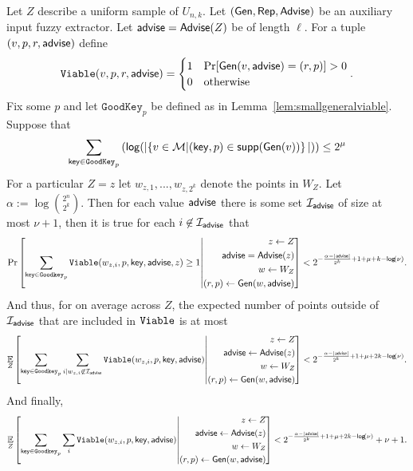 \begin{corollary}
\label{corollary:info loss}
Let $Z$ describe a uniform sample of $U_{n,k}$.  Let $({\mathsf{Gen}}, {\mathsf{Rep}}, {\mathsf{Advise}})$ be an auxiliary input fuzzy extractor.  Let ${\mathsf{advise}} = {\mathsf{Advise}}(Z)$ be of length $\ell$.  For a tuple $(v, p, r, {\mathsf{advise}})$ define 
\[
\mathtt{Viable}(v, p, r, {\mathsf{advise}}) = \begin{cases} 1& \Pr[{\mathsf{Gen}}(v, {\mathsf{advise}}) = (r, p)]>0\\0&\text{otherwise}\end{cases}.\]
Fix some $p$ and let $\mathtt{GoodKey}_p$ be defined as in Lemma~\ref{lem:smallgeneralviable}. Suppose that 
\[
   \sum_{\mathsf{key}\in \mathtt{GoodKey}_p} \left( \mathsf{log}\!\left(|\!\left\{ v \in \mathcal{M}|\!\left(\mathsf{key}, p\right) \in \mathsf{supp}\!\left(\mathsf{Gen}(v)\right) \right\}|\right)\right) \le 2^\mu 
 \]
 For a particular $Z=z$ let $w_{z,1},..., w_{z,2^k}$ denote the points in $W_Z$. Let $\alpha:= \log {2^n\choose 2^k}$.  
 Then for each value ${\mathsf{advise}}$ there is some set $\mathcal{I}_{{\mathsf{advise}}}$ of size at most $\nu+1$, then it is true for each $i\not \in \mathcal{I}_{\mathsf{advise}}$ that
\[
\Pr\left[\sum_{\mathsf{key} \in \mathtt{Goodkey}_p} \mathtt{Viable}(w_{z,i}, p, \mathsf{key}, {\mathsf{advise}}, z) \ge 1\middle| \begin{aligned} z\leftarrow Z\\ {\mathsf{advise}}= {\mathsf{Advise}}(z)\\w\leftarrow W_Z\\(r, p)\leftarrow {\ensuremath{\mathsf{Gen}}}(w, {\mathsf{advise}}) \end{aligned} \right]< 2^{-\frac{\alpha-|{\mathsf{advise}}|}{2^k}+1+\mu+k-\mathsf{log}\!\left(\nu\right) }.
\]
And thus, for on average across $Z$, the expected number of points outside of $\mathcal{I}_{\mathsf{advise}}$ that are included in $\mathtt{Viable}$ is at most 
\begin{align*}
\operatorname*{\mathbb{E}}_{Z} \left[\sum_{\mathsf{key} \in \mathtt{Goodkey}_p}\sum_{i | w_{z,i}\not\in\mathcal{I}_{\mathsf{advise}}} \mathtt{Viable}(w_{z,i}, p, \mathsf{key}, {\mathsf{advise}}) \middle| \begin{aligned} z\leftarrow Z\\ {\mathsf{advise}}\leftarrow {\ensuremath{\mathsf{Advise}}}(z)\\w\leftarrow W_Z\\(r, p)\leftarrow {\ensuremath{\mathsf{Gen}}}(w, {\mathsf{advise}})\end{aligned} \right]< 2^{-\frac{\alpha - |{\mathsf{advise}}|}{2^k}+1+\mu+2k-\mathsf{log}\!\left(\nu\right)}.
\end{align*}
And finally, 
\begin{align*}
\operatorname*{\mathbb{E}}_{Z} \left[\sum_{\mathsf{key} \in \mathtt{Goodkey}_p}\sum_{i }  \mathtt{Viable}(w_{z,i}, p, \mathsf{key}, {\mathsf{advise}}) \middle| \begin{aligned} z\leftarrow Z\\ {\mathsf{advise}}\leftarrow {\ensuremath{\mathsf{Advise}}}(z)\\w\leftarrow W_Z\\(r, p)\leftarrow {\ensuremath{\mathsf{Gen}}}(w, {\mathsf{advise}})\end{aligned} \right]< 2^{-\frac{\alpha-|{\mathsf{advise}}|}{2^k}+1+\mu+2k-\mathsf{log}\!\left(\nu\right)}+\nu+1.
\end{align*}

\end{corollary}


